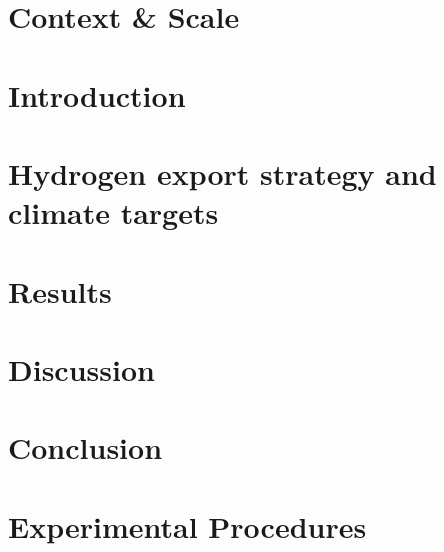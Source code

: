 \documentclass[5p]{elsarticle}
\begin{document}

\section*{Context \& Scale}







\section{Introduction}
\label{sec:intro}



\section{Hydrogen export strategy and climate targets}
\label{sec:policyandtargets}





\section{Results}
\label{sec:results}



\section{Discussion}
\label{sec:discussion}



\section{Conclusion}
\label{sec:conclusion}



\section{Experimental Procedures}
\label{sec:methods}


\end{document}
